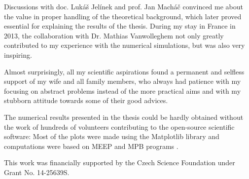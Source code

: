 Discussions with doc. Lukáš Jelínek and prof. Jan Macháč convinced me about the value in proper handling of the theoretical background, which later proved essential for explaining the results of the thesis. During my stay in France in 2013, the collaboration with Dr. Mathias Vanwolleghem not only greatly contributed to my experience with the numerical simulations, but was also very inspiring. 

Almost surprisingly, all my scientific aspirations found a permanent and selfless support of my wife and all family members, who always had patience with my focusing on abstract problems instead of the more practical aims and with my stubborn attitude towards some of their good advices.

The numerical results presented in the thesis could be hardly obtained without the work of hundreds of volunteers contributing to the open-source scientific software: Most of the plots were made using the Matplotlib library \cite{hunter2007} and computations were based on MEEP \cite{oskooi2010meep} and MPB programs \cite{johnson2001mpb}. 

This work was financially supported by the Czech Science Foundation under Grant No. 14-25639S.

\thispagestyle{empty} \newpage
